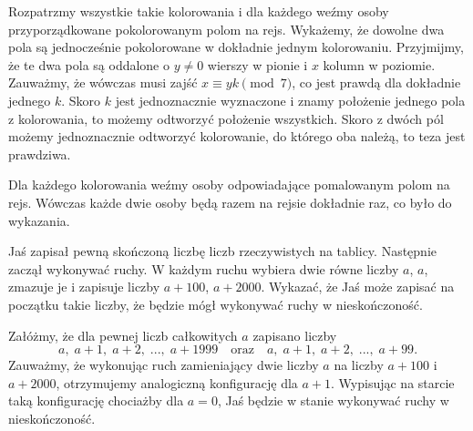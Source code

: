 \begin{center}
\end{center}

\noindent
Rozpatrzmy wszystkie takie kolorowania i dla każdego weźmy osoby przyporządkowane pokolorowanym polom na rejs. Wykażemy, że dowolne dwa pola są jednocześnie pokolorowane w dokładnie jednym kolorowaniu. Przyjmijmy, że te dwa pola są oddalone o $y \neq 0$ wierszy w pionie i $x$ kolumn w poziomie. Zauważmy, że wówczas musi zajść ${x \equiv yk \pmod{7}}$, co jest prawdą dla dokładnie jednego $k$. Skoro $k$ jest jednoznacznie wyznaczone i znamy położenie jednego pola z kolorowania, to możemy odtworzyć położenie wszystkich. Skoro z dwóch pól możemy jednoznacznie odtworzyć kolorowanie, do którego oba należą, to teza jest prawdziwa.


\vspace{10px}
\noindent
Dla każdego kolorowania weźmy osoby odpowiadające pomalowanym polom na rejs. Wówczas każde dwie osoby będą razem na rejsie dokładnie raz, co było do wykazania.

\vspace{10px}

\begin{problem}{6}
	Jaś zapisał pewną skończoną liczbę liczb rzeczywistych na tablicy. Następnie zaczął wykonywać ruchy. W każdym ruchu wybiera dwie równe liczby $a$, $a$, zmazuje je i zapisuje liczby $a + 100$, $a + 2000$. Wykazać, że Jaś może zapisać na początku takie liczby, że będzie mógł wykonywać ruchy w nieskończoność.
\end{problem}

\noindent
Załóżmy, że dla pewnej liczb całkowitych $a$ zapisano liczby
\[
	a,\; a + 1,\; a + 2,\; ...,\; a + 1999 \quad \text{oraz} \quad
	a,\; a + 1,\; a + 2,\; ..., \; a + 99.
\]
Zauważmy, że wykonując ruch zamieniający dwie liczby $a$ na liczby $a + 100$ i $a + 2000$, otrzymujemy analogiczną konfigurację dla $a + 1$. Wypisując na starcie taką konfigurację chociażby dla $a = 0$, Jaś będzie w stanie wykonywać ruchy w nieskończoność.



